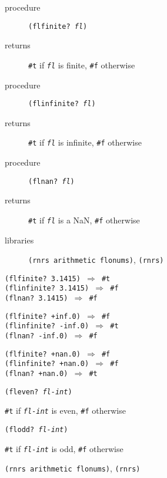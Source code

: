 \begin{description}

\label{objects_s181}\item[procedure] \texttt{(flfinite? \textit{fl})}



\item[returns] \texttt{\#{}t} if \texttt{\textit{fl}} is finite, \texttt{\#{}f} otherwise


\item[procedure] \texttt{(flinfinite? \textit{fl})}



\item[returns] \texttt{\#{}t} if \texttt{\textit{fl}} is infinite, \texttt{\#{}f} otherwise


\item[procedure] \texttt{(flnan? \textit{fl})}



\item[returns] \texttt{\#{}t} if \texttt{\textit{fl}} is a NaN, \texttt{\#{}f} otherwise


\item[libraries] \texttt{(rnrs arithmetic flonums)}, \texttt{(rnrs)}
\end{description}


\begin{alltt}
(flfinite? 3.1415) \(\Rightarrow\) \#{}t
(flinfinite? 3.1415) \(\Rightarrow\) \#{}f
(flnan? 3.1415) \(\Rightarrow\) \#{}f

(flfinite? +inf.0) \(\Rightarrow\) \#{}f
(flinfinite? -inf.0) \(\Rightarrow\) \#{}t
(flnan? -inf.0) \(\Rightarrow\) \#{}f

(flfinite? +nan.0) \(\Rightarrow\) \#{}f
(flinfinite? +nan.0) \(\Rightarrow\) \#{}f
(flnan? +nan.0) \(\Rightarrow\) \#{}t
\end{alltt}

\begin{description}

\label{objects_s182}\item[procedure] \texttt{(fleven? \textit{fl-int})}



\item[returns] \texttt{\#{}t} if \texttt{\textit{fl-int}} is even, \texttt{\#{}f} otherwise


\item[procedure] \texttt{(flodd? \textit{fl-int})}



\item[returns] \texttt{\#{}t} if \texttt{\textit{fl-int}} is odd, \texttt{\#{}f} otherwise


\item[libraries] \texttt{(rnrs arithmetic flonums)}, \texttt{(rnrs)}
\end{description}

